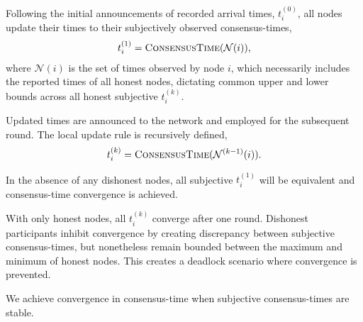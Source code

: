 Following the initial announcements of recorded arrival times, $t_i^{(0)}$, all nodes update their times to their subjectively observed consensus-times,
\begin{align}
	t_i^{(1)} = \textsc{ConsensusTime}(\mathcal{N}(i)),
\end{align}
where $\mathcal{N}(i)$ is the set of times observed by node $i$, which necessarily includes the reported times of all honest nodes, dictating common upper and lower bounds across all honest subjective $t_i^{(k)}$.

Updated times are announced to the network and employed for the subsequent round. The local update rule is recursively defined,
\begin{align}
	t_i^{(k)} = \textsc{ConsensusTime}(\mathcal{N}^{(k-1)}(i)).
\end{align}

In the absence of any dishonest nodes, all subjective $t_i^{(1)}$ will be equivalent and consensus-time convergence is achieved.

With only honest nodes, all $t_i^{(k)}$ converge after one round. Dishonest participants inhibit convergence by creating discrepancy between subjective consensus-times, but nonetheless remain bounded between the maximum and minimum of honest nodes. This creates a deadlock scenario where convergence is prevented.




We achieve convergence in consensus-time when subjective consensus-times are stable.


%
%
